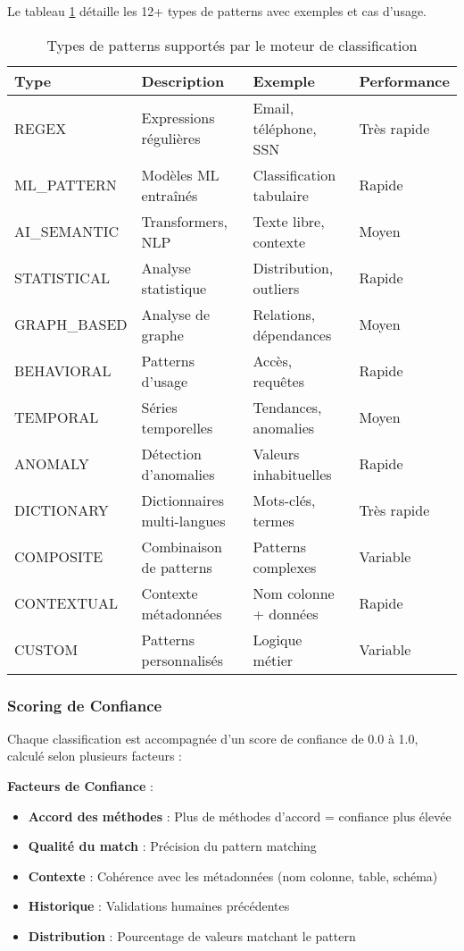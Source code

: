 Le tableau \ref{tab:types_patterns} détaille les 12+ types de patterns avec exemples et cas d'usage.

\begin{table}[htpb]
\centering
\caption{Types de patterns supportés par le moteur de classification}
\label{tab:types_patterns}
\begin{tabular}{|p{}|p{}|p{}|p{}|}
\hline
\textbf{Type} & \textbf{Description} & \textbf{Exemple} & \textbf{Performance} \\
\hline
REGEX & Expressions régulières & Email, téléphone, SSN & Très rapide \\
\hline
ML\_PATTERN & Modèles ML entraînés & Classification tabulaire & Rapide \\
\hline
AI\_SEMANTIC & Transformers, NLP & Texte libre, contexte & Moyen \\
\hline
STATISTICAL & Analyse statistique & Distribution, outliers & Rapide \\
\hline
GRAPH\_BASED & Analyse de graphe & Relations, dépendances & Moyen \\
\hline
BEHAVIORAL & Patterns d'usage & Accès, requêtes & Rapide \\
\hline
TEMPORAL & Séries temporelles & Tendances, anomalies & Moyen \\
\hline
ANOMALY & Détection d'anomalies & Valeurs inhabituelles & Rapide \\
\hline
DICTIONARY & Dictionnaires multi-langues & Mots-clés, termes & Très rapide \\
\hline
COMPOSITE & Combinaison de patterns & Patterns complexes & Variable \\
\hline
CONTEXTUAL & Contexte métadonnées & Nom colonne + données & Rapide \\
\hline
CUSTOM & Patterns personnalisés & Logique métier & Variable \\
\hline
\end{tabular}
\end{table}

\subsubsection{Scoring de Confiance}

Chaque classification est accompagnée d'un score de confiance de 0.0 à 1.0, calculé selon plusieurs facteurs :

\textbf{Facteurs de Confiance} :
\begin{itemize}
    \item \textbf{Accord des méthodes} : Plus de méthodes d'accord = confiance plus élevée
    \item \textbf{Qualité du match} : Précision du pattern matching
    \item \textbf{Contexte} : Cohérence avec les métadonnées (nom colonne, table, schéma)
    \item \textbf{Historique} : Validations humaines précédentes
    \item \textbf{Distribution} : Pourcentage de valeurs matchant le pattern
\end{itemize}


